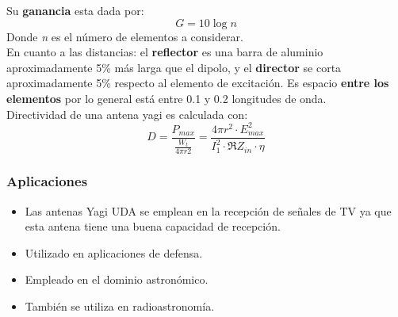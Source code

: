 \documentclass[
	12pt, %
	fleqn, %
	a4paper, %
	oneside, %
]{LegrandOrangeBook}
\begin{document}
Su \textbf{ganancia} esta dada por:
\begin{equation}
G=10\log n
\end{equation}
Donde \textit{n} es el número de elementos a considerar.\\
En cuanto a las distancias: el \textbf{reflector} es una barra de aluminio aproximadamente 5\% más larga que el dipolo, y el \textbf{director} se corta aproximadamente 5\% respecto al elemento de excitación. Es espacio \textbf{entre los elementos} por lo general está entre 0.1 y 0.2 longitudes de onda.\\
Directividad de una antena yagi es calculada con:
\begin{equation}
D=\frac{P_{max}}{\frac{W_t}{4\pi r2}}=\frac{4\pi r^2\cdot E_{max}^2}{I_1^2\cdot \Re{Z_{in}}\cdot\eta}
\end{equation}
\subsubsection{Aplicaciones}
\begin{itemize}
\item Las antenas Yagi UDA se emplean en la recepción de señales de TV ya que esta antena tiene una buena capacidad de recepción.
\item Utilizado en aplicaciones de defensa.
\item Empleado en el dominio astronómico.
\item También se utiliza en radioastronomía.
\end{itemize}
\end{document}
